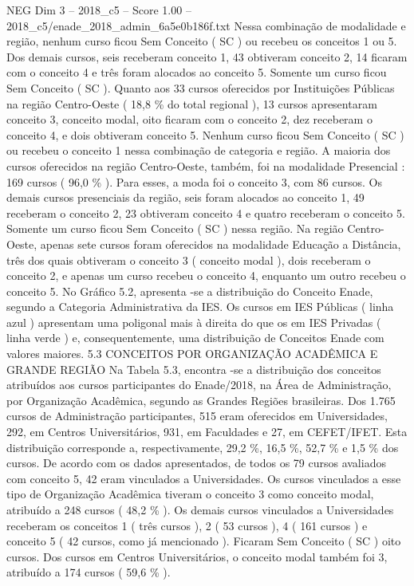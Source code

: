 \begin{textsample}{NEG Dim 3 – 2018\_c5 – Score 1.00 – 2018\_c5/enade\_2018\_admin\_6a5e0b186f.txt}
Nessa combinação de modalidade e região, nenhum curso ficou Sem Conceito ( SC ) ou recebeu os conceitos 1 ou 5.
Dos demais cursos, seis receberam conceito 1, 43 obtiveram conceito 2, 14 ficaram com o conceito 4 e três foram alocados ao conceito 5.
Somente um curso ficou Sem Conceito ( SC ).
Quanto aos 33 cursos oferecidos por Instituições Públicas na região Centro-Oeste ( 18,8 \% do total regional ), 13 cursos apresentaram conceito 3, conceito modal, oito ficaram com o conceito 2, dez receberam o conceito 4, e dois obtiveram conceito 5.
Nenhum curso ficou Sem Conceito ( SC ) ou recebeu o conceito 1 nessa combinação de categoria e região.
A maioria dos cursos oferecidos na região Centro-Oeste, também, foi na modalidade Presencial : 169 cursos ( 96,0 \% ).
Para esses, a moda foi o conceito 3, com 86 cursos.
Os demais cursos presenciais da região, seis foram alocados ao conceito 1, 49 receberam o conceito 2, 23 obtiveram conceito 4 e quatro receberam o conceito 5.
Somente um curso ficou Sem Conceito ( SC ) nessa região.
Na região Centro-Oeste, apenas sete cursos foram oferecidos na modalidade Educação a Distância, três dos quais obtiveram o conceito 3 ( conceito modal ), dois receberam o conceito 2, e apenas um curso recebeu o conceito 4, enquanto um outro recebeu o conceito 5.
No Gráfico 5.2, apresenta -se a distribuição do Conceito Enade, segundo a Categoria Administrativa da IES.
Os cursos em IES Públicas ( linha azul ) apresentam uma poligonal mais à direita do que os em IES Privadas ( linha verde ) e, consequentemente, uma distribuição de Conceitos Enade com valores maiores. 5.3 CONCEITOS POR ORGANIZAÇÃO ACADÊMICA E GRANDE REGIÃO Na Tabela 5.3, encontra -se a distribuição dos conceitos atribuídos aos cursos participantes do Enade/2018, na Área de Administração, por Organização Acadêmica, segundo as Grandes Regiões brasileiras.
Dos 1.765 cursos de Administração participantes, 515 eram oferecidos em Universidades, 292, em Centros Universitários, 931, em Faculdades e 27, em CEFET/IFET.
Esta distribuição corresponde a, respectivamente, 29,2 \%, 16,5 \%, 52,7 \% e 1,5 \% dos cursos.
De acordo com os dados apresentados, de todos os 79 cursos avaliados com conceito 5, 42 eram vinculados a Universidades.
Os cursos vinculados a esse tipo de Organização Acadêmica tiveram o conceito 3 como conceito modal, atribuído a 248 cursos ( 48,2 \% ).
Os demais cursos vinculados a Universidades receberam os conceitos 1 ( três cursos ), 2 ( 53 cursos ), 4 ( 161 cursos ) e conceito 5 ( 42 cursos, como já mencionado ).
Ficaram Sem Conceito ( SC ) oito cursos.
Dos cursos em Centros Universitários, o conceito modal também foi 3, atribuído a 174 cursos ( 59,6 \% ).

\end{textsample}
